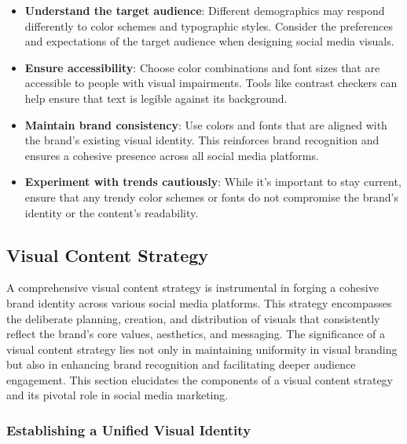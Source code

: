 \documentclass[
]{book}
\providecommand{\tightlist}{%
  \setlength{\itemsep}{0pt}\setlength{\parskip}{0pt}}
\begin{document}
\begin{itemize}
\tightlist
\item
  \textbf{Understand the target audience}: Different demographics may respond differently to color schemes and typographic styles. Consider the preferences and expectations of the target audience when designing social media visuals.
\item
  \textbf{Ensure accessibility}: Choose color combinations and font sizes that are accessible to people with visual impairments. Tools like contrast checkers can help ensure that text is legible against its background.
\item
  \textbf{Maintain brand consistency}: Use colors and fonts that are aligned with the brand's existing visual identity. This reinforces brand recognition and ensures a cohesive presence across all social media platforms.
\item
  \textbf{Experiment with trends cautiously}: While it's important to stay current, ensure that any trendy color schemes or fonts do not compromise the brand's identity or the content's readability.
\end{itemize}

\hypertarget{visual-content-strategy}{%
\subsection*{Visual Content Strategy}\label{visual-content-strategy}}

A comprehensive visual content strategy is instrumental in forging a cohesive brand identity across various social media platforms. This strategy encompasses the deliberate planning, creation, and distribution of visuals that consistently reflect the brand's core values, aesthetics, and messaging. The significance of a visual content strategy lies not only in maintaining uniformity in visual branding but also in enhancing brand recognition and facilitating deeper audience engagement. This section elucidates the components of a visual content strategy and its pivotal role in social media marketing.

\hypertarget{establishing-a-unified-visual-identity}{%
\subsubsection*{Establishing a Unified Visual Identity}\label{establishing-a-unified-visual-identity}}
\end{document}
